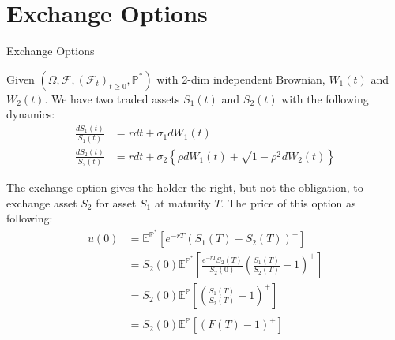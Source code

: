 \documentclass{beamer}
\begin{document}
\section{Exchange Options}
\begin{frame}{Exchange Options}

    {\footnotesize \footnotesize
    \par Given $(\Omega, \mathcal{F}, (\mathcal{F}_t)_{t \geq 0}, \mathbb{P}^*)$ 
    with 2-dim independent Brownian, \( W_1(t) \) and \( W_2(t) \). 
    We have two traded assets \( S_1(t) \) and \( S_2(t) \) with the following dynamics:
    \begin{align*}
    \frac{dS_1(t)}{S_1(t)} &= rdt + \sigma_1 dW_1(t) \\
    \frac{dS_2(t)}{S_2(t)} &= rdt + \sigma_2 \left\{ \rho dW_1(t) + \sqrt{1 - \rho^2} dW_2(t) \right\}
    \end{align*}
    \par The exchange option gives the holder the right, but not the obligation, 
    to exchange asset \(S_2\) for asset \(S_1\) at maturity \(T\). The price of this option as following:
    \begin{align*}
        u(0) &= \mathbb{E}^{\mathbb{P}^*}\left[e^{-rT}(S_1(T) - S_2(T))^+\right]\\
        &=S_2(0) \mathbb{E}^{\mathbb{P}^*}\left[ \frac{e^{-rT} S_2(T)}{S_2(0)} \left( \frac{S_1(T)}{S_2(T)} - 1 \right)^+ \right] \\
        &= S_2(0) \mathbb{E}^{\tilde{\mathbb{P}}} \left[ \left( \frac{S_1(T)}{S_2(T)} - 1 \right)^+ \right] \\
        &= S_2(0) \mathbb{E}^{\tilde{\mathbb{P}}} \left[ (F(T) - 1)^+ \right]
    \end{align*}

    }
\end{frame}
\end{document}
